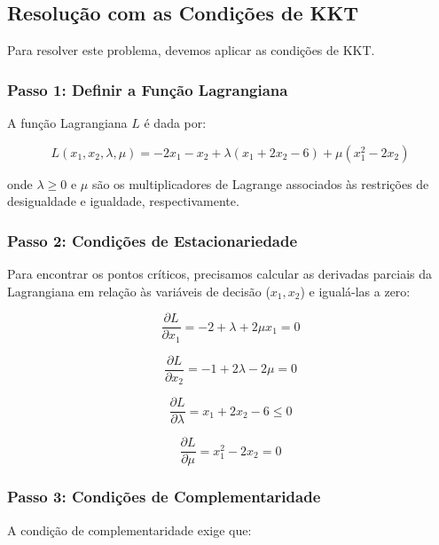 \documentclass[a4paper, 12pt]{article}
\begin{document}
\subsection{Resolu\c{c}\~ao com as Condições de KKT}

Para resolver este problema, devemos aplicar as condi\c{c}\~oes de KKT.

\subsubsection{Passo 1: Definir a Fun\c{c}\~ao Lagrangiana}
A fun\c{c}\~ao Lagrangiana \(L\) \'e dada por:

\begin{equation*}
    L(x_1, x_2, \lambda, \mu) = -2x_1 - x_2 + \lambda (x_1 + 2x_2 - 6) + \mu (x_1^2 - 2x_2)
\end{equation*}

onde \(\lambda \geq 0\) e \(\mu\) s\~ao os multiplicadores de Lagrange associados \`as restri\c{c}\~oes de desigualdade e igualdade, respectivamente.

\subsubsection{Passo 2: Condi\c{c}\~oes de Estacionariedade}
Para encontrar os pontos cr\'iticos, precisamos calcular as derivadas parciais da Lagrangiana em rela\c{c}\~ao \`as vari\'aveis de decis\~ao ($x_1, x_2$) e igual\'a-las a zero:

\begin{equation*}
    \frac{\partial L}{\partial x_1} = -2 + \lambda + 2\mu x_1 = 0
\end{equation*}

\begin{equation*}
    \frac{\partial L}{\partial x_2} = -1 + 2\lambda - 2\mu = 0
\end{equation*}

\begin{equation*}
    \frac{\partial L}{\partial \lambda} = x_1 + 2x_2 - 6 \leq 0
\end{equation*}

\begin{equation*}
    \frac{\partial L}{\partial \mu} = x_1^2 - 2x_2 = 0
\end{equation*}

\subsubsection{Passo 3: Condi\c{c}\~oes de Complementaridade}
A condi\c{c}\~ao de complementaridade exige que:
\end{document}
